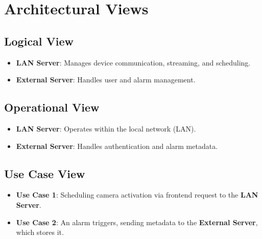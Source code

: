 \documentclass{article}
\begin{document}
\section{Architectural Views}
\subsection{Logical View}
\begin{itemize}
    \item \textbf{LAN Server}: Manages device communication, streaming, and scheduling.
    \item \textbf{External Server}: Handles user and alarm management.
\end{itemize}

\subsection{Operational View}
\begin{itemize}
    \item \textbf{LAN Server}: Operates within the local network (LAN).
    \item \textbf{External Server}: Handles authentication and alarm metadata.
\end{itemize}

\subsection{Use Case View}
\begin{itemize}
    \item \textbf{Use Case 1}: Scheduling camera activation via frontend request to the \textbf{LAN Server}.
    \item \textbf{Use Case 2}: An alarm triggers, sending metadata to the \textbf{External Server}, which stores it.
\end{itemize}
\end{document}
